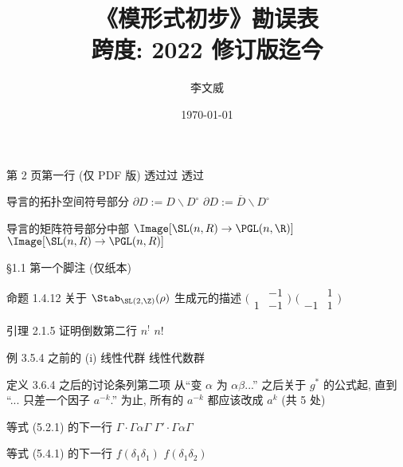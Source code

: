 \documentclass{AJerrata}
\title{\bfseries 《模形式初步》勘误表 \\ 跨度: 2022 修订版迄今}
\author{李文威}
\date{\today}
\begin{document}
	\maketitle
	
	\begin{Errata}
		\item[第 2 页第一行 (仅 PDF 版)]
		\Orig 透过过
		\Corr 透过
		
		\item[导言的拓扑空间符号部分]
		\Orig $\partial D := D \smallsetminus D^\circ$
		\Corr $\partial D := \overline{D} \smallsetminus D^\circ$
		
		\item[导言的矩阵符号部分中部]
		\Orig $\Image[\SL(n, R) \to \PGL(n, \R)]$
		\Corr $\Image[\SL(n, R) \to \PGL(n, R)]$
		
		\item[\S 1.1 第一个脚注 (仅纸本)]
		\Orig [50]
		\Corr [59]
		
		\item[命题 1.4.12 关于 $\Stab_{\SL(2, \Z)}(\rho)$ 生成元的描述]
		\Orig $\bigl(\begin{smallmatrix} & -1 \\ 1 & -1 \end{smallmatrix}\bigr)$
		\Corr $\bigl(\begin{smallmatrix} & 1 \\ -1 & 1 \end{smallmatrix}\bigr)$
		
		\item[引理 2.1.5 证明倒数第二行]
		\Orig $n^!$
		\Corr $n!$

		\item[例 3.5.4 之前的 (i)]
		\Orig 线性代群
		\Corr 线性代数群


		\item[定义 3.6.4 之后的讨论条列第二项]
		从``变 $\alpha$ 为 $\alpha\beta$...'' 之后关于 $g^*$ 的公式起, 直到 ``... 只差一个因子 $a^{-k}$.'' 为止, 所有的 $a^{-k}$ 都应该改成 $a^k$ (共 5 处)
		
		
		\item[等式 (5.2.1) 的下一行]
		\Orig $\Gamma \cdot \Gamma \alpha \Gamma$
		\Corr $\Gamma' \cdot \Gamma \alpha \Gamma$
		
		\item[等式 (5.4.1) 的下一行]
		\Orig $f(\delta_1 \delta_1)$
		\Corr $f(\delta_1 \delta_2)$
		

\end{Errata}
\end{document}

